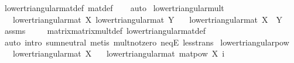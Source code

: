 \begin{isabellebody}
%
\isatagproof
{}\isamarkupfalse%
\ lower{\isacharunderscore}{\kern0pt}triangular{\isacharunderscore}{\kern0pt}mat{\isacharunderscore}{\kern0pt}def\ mat{\isacharunderscore}{\kern0pt}def\isanewline
\ \ \isamarkupfalse%
\ auto%
\endisatagproof
{\isafoldproof}%
%
\isadelimproof
\isanewline
%
\endisadelimproof
\isanewline
{}\isamarkupfalse%
\ lower{\isacharunderscore}{\kern0pt}triangular{\isacharunderscore}{\kern0pt}mult{\isacharcolon}{\kern0pt}\isanewline
\ \ \ {\isachardoublequoteopen}lower{\isacharunderscore}{\kern0pt}triangular{\isacharunderscore}{\kern0pt}mat\ X{\isachardoublequoteclose}\ {\isachardoublequoteopen}lower{\isacharunderscore}{\kern0pt}triangular{\isacharunderscore}{\kern0pt}mat\ Y{\isachardoublequoteclose}\isanewline
\ \ \ {\isachardoublequoteopen}lower{\isacharunderscore}{\kern0pt}triangular{\isacharunderscore}{\kern0pt}mat\ {\isacharparenleft}{\kern0pt}X\ {\isacharasterisk}{\kern0pt}{\isacharasterisk}{\kern0pt}\ Y{\isacharparenright}{\kern0pt}{\isachardoublequoteclose}\isanewline
%
\isadelimproof
\ \ %
\endisadelimproof
%
\isatagproof
{}\isamarkupfalse%
\ assms\ \isanewline
\ \ \isamarkupfalse%
\ matrix{\isacharunderscore}{\kern0pt}matrix{\isacharunderscore}{\kern0pt}mult{\isacharunderscore}{\kern0pt}def\ lower{\isacharunderscore}{\kern0pt}triangular{\isacharunderscore}{\kern0pt}mat{\isacharunderscore}{\kern0pt}def\isanewline
\ \ \isamarkupfalse%
\ {\isacharparenleft}{\kern0pt}auto\ intro{\isacharbang}{\kern0pt}{\isacharcolon}{\kern0pt}\ sum{\isachardot}{\kern0pt}neutral{\isacharparenright}{\kern0pt}\ {\isacharparenleft}{\kern0pt}metis\ mult{\isacharunderscore}{\kern0pt}not{\isacharunderscore}{\kern0pt}zero\ neqE\ less{\isacharunderscore}{\kern0pt}trans{\isacharparenright}{\kern0pt}%
\endisatagproof
{\isafoldproof}%
%
\isadelimproof
\isanewline
%
\endisadelimproof
\isanewline
{}\isamarkupfalse%
\ lower{\isacharunderscore}{\kern0pt}triangular{\isacharunderscore}{\kern0pt}pow{\isacharcolon}{\kern0pt}\isanewline
\ \ \ {\isachardoublequoteopen}lower{\isacharunderscore}{\kern0pt}triangular{\isacharunderscore}{\kern0pt}mat\ X{\isachardoublequoteclose}\isanewline
\ \ \ {\isachardoublequoteopen}lower{\isacharunderscore}{\kern0pt}triangular{\isacharunderscore}{\kern0pt}mat\ {\isacharparenleft}{\kern0pt}matpow\ X\ i{\isacharparenright}{\kern0pt}{\isachardoublequoteclose}\isanewline
%
\isadelimproof
\ \ %
\endisadelimproof
%
\isatagproof
{}\isamarkupfalse%

\end{isabellebody}
